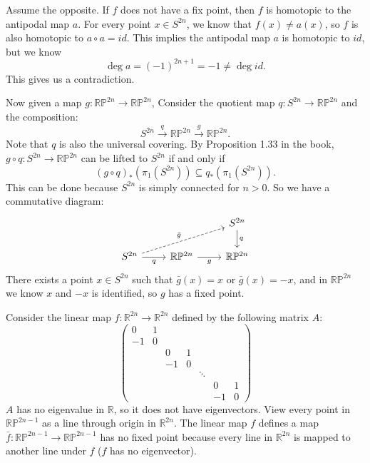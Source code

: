\documentclass[a4paper, 12pt]{article}
\begin{document}
\begin{solution}
Assume the opposite. If \(f\) does not have a fix point, then \(f\) is homotopic to the antipodal map \(a\). For every point \(x\in S^{2n}\), we know that \(f(x)\neq a(x)\), so \(f\) is also homotopic to 
\(a\circ a=id\). This implies the antipodal map \(a\) is homotopic to \(id\), but we know 
\[\deg a=(-1)^{2n+1}=-1\neq \deg id.\]
This gives us a contradiction. 

Now given a map \(g:\mathbb{R}\mathbb{P}^{2n}\rightarrow \mathbb{R}\mathbb{P}^{2n}\), Consider the quotient map \(q:S^{2n}\rightarrow \mathbb{R}\mathbb{P}^{2n}\) and the composition:
\[S^{2n}\xrightarrow{q}\mathbb{R}\mathbb{P}^{2n}\xrightarrow{g}\mathbb{R}\mathbb{P}^{2n}.\]
Note that \(q\) is also the universal covering. By Proposition 1.33 in the book, \(g\circ q:S^{2n}\rightarrow \mathbb{R}\mathbb{P}^{2n}\) can be lifted to \(S^{2n}\) if and only if 
\[(g\circ q)_*(\pi_1(S^{2n}))\subseteq q_*(\pi_1(S^{2n})).\]
This can be done because \(S^{2n}\) is simply connected for \(n>0\). So we have a commutative diagram:
\[\begin{tikzcd}
	&& {S^{2n}} \\
	{S^{2n}} & {\mathbb{R}\mathbb{P}^{2n}} & {\mathbb{R}\mathbb{P}^{2n}}
	\arrow["q", from=1-3, to=2-3]
	\arrow["{\bar{g}}", dashed, from=2-1, to=1-3]
	\arrow["q"', from=2-1, to=2-2]
	\arrow["g"', from=2-2, to=2-3]
\end{tikzcd}\]
There exists a point \(x\in S^{2n}\) such that \(\bar{g}(x)=x\) or \(\bar{g}(x)=-x\), and in \(\mathbb{R}\mathbb{P}^{2n}\) we know \(x\) and \(-x\) is identified, so \(g\) has a fixed point.

Consider the linear map \(f:\mathbb{R}^{2n}\rightarrow \mathbb{R}^{2n}\) defined by the following matrix \(A\):
\[\begin{pmatrix}
    0 & 1 &  &  &  &  &  \\
    -1 & 0 &  &  &  &  &  \\
     &  & 0 & 1 &  &  &  \\
     &  & -1 & 0 &  &  &  \\
     &  &  &  & \ddots &  &  \\
     &  &  &  &  & 0 & 1 \\
     &  &  &  &  & -1 & 0 
    \end{pmatrix}\]
\(A\) has no eigenvalue in \(\mathbb{R}\), so it does not have eigenvectors. View every point in \(\mathbb{R}\mathbb{P}^{2n-1}\) as a line through origin in \(\mathbb{R}^{2n}\). The linear map \(f\) defines a map 
\(\bar{f}:\mathbb{R}\mathbb{P}^{2n-1}\rightarrow \mathbb{R}\mathbb{P}^{2n-1}\) has no fixed point because every line in \(\mathbb{R}^{2n}\) is mapped to another line under \(f\) (\(f\) has no eigenvector).
\end{solution}
\end{document}

